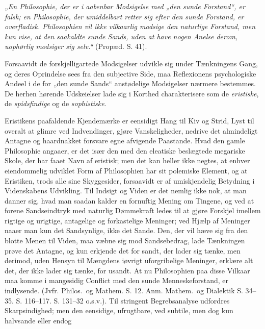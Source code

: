 \documentclass[12pt,a4paper]{book}
\begin{document}
\emph{„En Philosophie, der er i aabenbar Modsigelse med „den sunde
Forstand“, er falsk; en Philosophie, der umiddelbart retter sig efter
den sunde Forstand, er overfladisk. Philosophien vil ikke vilkaarlig
modsige den naturlige Forstand, men kun vise, at den saakaldte sunde
Sands, uden at have
nogen Anelse derom, uophørlig modsiger sig selv.“} (Propæd. S. 41).

Forsaavidt de forskjelligartede Modsigelser udvikle sig under
Tænkningens Gang, og deres Oprindelse sees fra den subjective Side,
maa Reflexionens psychologiske Andeel i de for „den sunde Sands“
anstødelige Modsigelser nærmere bestemmes. De herhen hørende
Udskeielser lade sig i Korthed charakterisere som de \emph{eristiske},
de \emph{spidsfindige} og de \emph{sophistiske}.

Eristikens paafaldende Kjendemærke er eensidigt Hang til Kiv og Strid,
Lyst til overalt at glimre ved Indvendinger, gjøre Vanskeligheder,
nedrive det almindeligt Antagne og haardnakket forsvare egne afvigende
Paastande. Hvad den gamle Philosophie angaaer, er det især den med
den eleatiske beslægtede megariske Skole, der har faaet Navn af
eristisk; men det kan heller ikke negtes,
at enhver eiendommelig udviklet Form af Philosophien har sit polemiske
Element, og at Eristiken, trods alle sine Skyggesider, forsaavidt er
af umiskjendelig Betydning i Videnskabens Udvikling. Til Indsigt og
Viden er det nemlig ikke nok, at man danner sig, hvad man saadan
kalder en fornuftig Mening om Tingene, og ved at forene Sandseindtryk
med naturlig Dømmekraft ledes til at gjøre Forskjel imellem rigtige og
urigtige, antagelige og forkastelige Meninger; ved Hjælp af Meninger
naaer man kun det Sandsynlige, ikke det Sande. Den, der vil hæve sig
fra den blotte Menen til Viden, maa væbne sig mod Sandsebedrag, lade
Tænkningen prøve det Antagne, og kun erkjende det for sandt, der lader
sig tænke, men derimod, uden Hensyn til Mængdens iøvrigt uforgribelige
Meninger, erklære alt det, der ikke lader sig tænke, for usandt. At
nu Philosophien paa disse Vilkaar maa komme i mangesidig Conflict med
den sunde Menneskeforstand, er indlysende. (Jvfr. Philos.\ og
Mathem. S. 12. Anm. Mathem.\ og Dialektik S. 34--35. S. 116--117.
S. 131--32 o.s.v.).
Til stringent Begrebsanalyse udfordres Skarpsindighed; men den
eensidige, ufrugtbare, ved subtile, men dog kun halvsande eller endog
\end{document}
